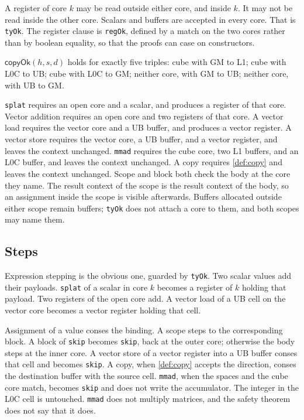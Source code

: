 \documentclass[a4paper,UKenglish,anonymous,cleveref,autoref]{lipics-v2021}
\begin{document}
A register of core \(k\) may be read outside either core, and inside \(k\).
It may not be read inside the other core.
Scalars and buffers are accepted in every core.
That is \texttt{tyOk}.
The register clause is \texttt{regOk}, defined by a match on the two cores rather than by boolean equality, so that the proofs can case on constructors.

\begin{definition}
\label{def:copy}
\(\mathsf{copyOk}(h, s, d)\) holds for exactly five triples:
cube with GM to L1;
cube with L0C to UB;
cube with L0C to GM;
neither core, with GM to UB;
neither core, with UB to GM.
\end{definition}

\texttt{splat} requires an open core and a scalar, and produces a register of that core.
Vector addition requires an open core and two registers of that core.
A vector load requires the vector core and a UB buffer, and produces a vector register.
A vector store requires the vector core, a UB buffer, and a vector register, and leaves the context unchanged.
\texttt{mmad} requires the cube core, two L1 buffers, and an L0C buffer, and leaves the context unchanged.
A copy requires \cref{def:copy} and leaves the context unchanged.
Scope and block both check the body at the core they name.
The result context of the scope is the result context of the body, so an assignment inside the scope is visible afterwards.
Buffers allocated outside either scope remain buffers; \texttt{tyOk} does not attach a core to them, and both scopes may name them.

\subsection{Steps}

Expression stepping is the obvious one, guarded by \texttt{tyOk}.
Two scalar values add their payloads.
\texttt{splat} of a scalar in core \(k\) becomes a register of \(k\) holding that payload.
Two registers of the open core add.
A vector load of a UB cell on the vector core becomes a vector register holding that cell.

Assignment of a value conses the binding.
A scope steps to the corresponding block.
A block of \texttt{skip} becomes \texttt{skip}, back at the outer core; otherwise the body steps at the inner core.
A vector store of a vector register into a UB buffer conses that cell and becomes \texttt{skip}.
A copy, when \cref{def:copy} accepts the direction, conses the destination buffer with the source cell.
\texttt{mmad}, when the spaces and the cube core match, becomes \texttt{skip} and does not write the accumulator.
The integer in the L0C cell is untouched.
\texttt{mmad} does not multiply matrices, and the safety theorem does not say that it does.
\end{document}
